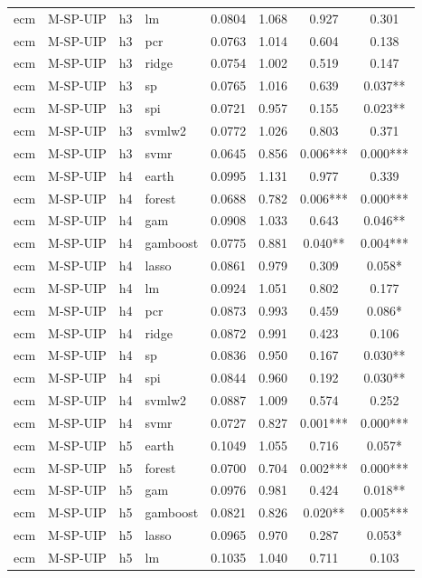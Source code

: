 \begin{ThreePartTable}
\begin{longtable}[t]{llclcccc}
ecm & M-SP-UIP & h3 & lm & 0.0804 & 1.068 & 0.927 & 0.301\\
ecm & M-SP-UIP & h3 & pcr & 0.0763 & 1.014 & 0.604 & 0.138\\
ecm & M-SP-UIP & h3 & ridge & 0.0754 & 1.002 & 0.519 & 0.147\\
ecm & M-SP-UIP & h3 & sp & 0.0765 & 1.016 & 0.639 & 0.037**\\
ecm & M-SP-UIP & h3 & spi & 0.0721 & 0.957 & 0.155 & 0.023**\\
ecm & M-SP-UIP & h3 & svmlw2 & 0.0772 & 1.026 & 0.803 & 0.371\\
ecm & M-SP-UIP & h3 & svmr & 0.0645 & 0.856 & 0.006*** & 0.000***\\
\addlinespace
ecm & M-SP-UIP & h4 & earth & 0.0995 & 1.131 & 0.977 & 0.339\\
ecm & M-SP-UIP & h4 & forest & 0.0688 & 0.782 & 0.006*** & 0.000***\\
ecm & M-SP-UIP & h4 & gam & 0.0908 & 1.033 & 0.643 & 0.046**\\
ecm & M-SP-UIP & h4 & gamboost & 0.0775 & 0.881 & 0.040** & 0.004***\\
ecm & M-SP-UIP & h4 & lasso & 0.0861 & 0.979 & 0.309 & 0.058*\\
ecm & M-SP-UIP & h4 & lm & 0.0924 & 1.051 & 0.802 & 0.177\\
ecm & M-SP-UIP & h4 & pcr & 0.0873 & 0.993 & 0.459 & 0.086*\\
ecm & M-SP-UIP & h4 & ridge & 0.0872 & 0.991 & 0.423 & 0.106\\
ecm & M-SP-UIP & h4 & sp & 0.0836 & 0.950 & 0.167 & 0.030**\\
ecm & M-SP-UIP & h4 & spi & 0.0844 & 0.960 & 0.192 & 0.030**\\
ecm & M-SP-UIP & h4 & svmlw2 & 0.0887 & 1.009 & 0.574 & 0.252\\
ecm & M-SP-UIP & h4 & svmr & 0.0727 & 0.827 & 0.001*** & 0.000***\\
\addlinespace
ecm & M-SP-UIP & h5 & earth & 0.1049 & 1.055 & 0.716 & 0.057*\\
ecm & M-SP-UIP & h5 & forest & 0.0700 & 0.704 & 0.002*** & 0.000***\\
ecm & M-SP-UIP & h5 & gam & 0.0976 & 0.981 & 0.424 & 0.018**\\
ecm & M-SP-UIP & h5 & gamboost & 0.0821 & 0.826 & 0.020** & 0.005***\\
ecm & M-SP-UIP & h5 & lasso & 0.0965 & 0.970 & 0.287 & 0.053*\\
ecm & M-SP-UIP & h5 & lm & 0.1035 & 1.040 & 0.711 & 0.103\\

\end{longtable}
\end{ThreePartTable}

